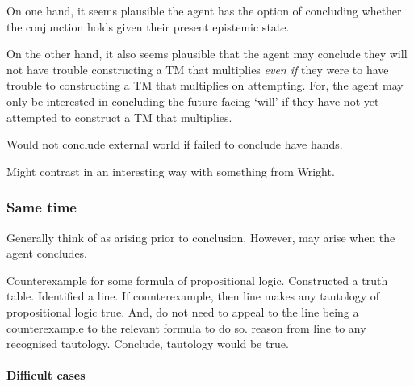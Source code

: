 \begin{note}[No entanglement]
{    On one hand, it seems plausible the agent has the option of concluding whether the conjunction holds given their present epistemic state.

    On the other hand, it also seems plausible that the agent may conclude they will not have trouble constructing a TM that multiplies \emph{even if} they were to have trouble to constructing a TM that multiplies on attempting.
    For, the agent may only be interested in concluding the future facing `will' if they have not yet attempted to construct a TM that multiplies.
  }
\end{note}

\begin{note}[Maybe?]
  Would not conclude external world if failed to conclude have hands.

  {
    \color{red}
    Might contrast in an interesting way with something from Wright.
  }
\end{note}

\subsubsection{Same time}

\begin{note}
  Generally think of \requ{} as arising prior to conclusion.
  However, may arise when the agent concludes.
\end{note}

\begin{note}
  Counterexample for some formula of propositional logic.
  Constructed a truth table.
  Identified a line.
  If counterexample, then line makes any tautology of propositional logic true.
  And, do not need to appeal to the line being a counterexample to the relevant formula to do so.
  reason from line to any recognised tautology.
  Conclude, tautology would be true.
\end{note}

\paragraph{Difficult cases}



